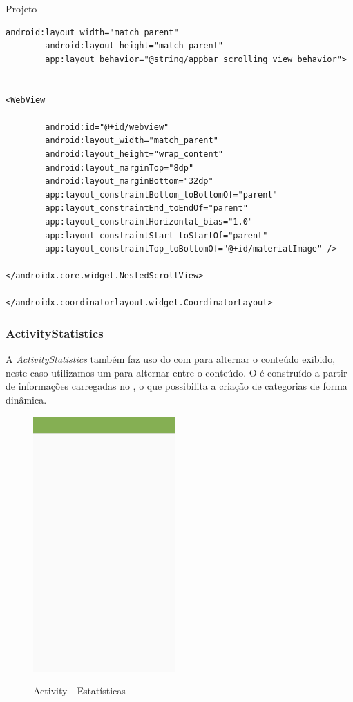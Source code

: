 \documentclass[
	12pt,				%
	openright,			%
	twoside,			%
	a4paper,			%
	english,			%
	french,				%
	spanish,			%
	brazil				%
	]{abntex2}
\begin{document}
\begin{chapter}{Projeto}
\begin{lstlisting}[numbers=none,basicstyle=\small,
caption={ActivityMaterialDetails.xml},
title={ActivityMaterialDetails.xml},
label={ActivityMaterialDetails.xml}]
		android:layout_width="match_parent"
		android:layout_height="match_parent"
		app:layout_behavior="@string/appbar_scrolling_view_behavior">


<WebView

		android:id="@+id/webview"
		android:layout_width="match_parent"
		android:layout_height="wrap_content"
		android:layout_marginTop="8dp"
		android:layout_marginBottom="32dp"
		app:layout_constraintBottom_toBottomOf="parent"
		app:layout_constraintEnd_toEndOf="parent"
		app:layout_constraintHorizontal_bias="1.0"
		app:layout_constraintStart_toStartOf="parent"
		app:layout_constraintTop_toBottomOf="@+id/materialImage" />
		
</androidx.core.widget.NestedScrollView>

</androidx.coordinatorlayout.widget.CoordinatorLayout>

\end{lstlisting}

\newpage
\subsubsection{ActivityStatistics}
\label{ActivityStatistics}
A  \textit{ActivityStatistics} também faz uso do  com  para alternar o conteúdo exibido, neste caso utilizamos um  para alternar entre o conteúdo. O  é construído a partir de informações carregadas no , o que possibilita a criação de categorias de forma dinâmica.

\begin{figure}[h]
\centering
   \caption{Activity - Estatísticas}
   \includegraphics[scale=1.0]{media/tela_stats_act.png}
     \label{fig:tela_stats_act}
\end{figure}


\end{chapter}
\end{document}
